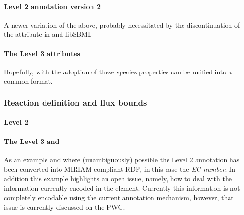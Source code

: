 \paragraph{\SBML Level 2 \Species annotation version 2}
A newer variation of the above, probably necessitated by the discontinuation of the  attribute in \SBML and \textsf{libSBML}
%

\paragraph{The \SBML Level 3 \Species attributes}
Hopefully, with the adoption of \SBML \FBC these species properties can be unified into a common format.
%

\subsubsection*{Reaction definition and flux bounds}

\paragraph{\SBML Level 2 \Reaction}
%

\paragraph{The \SBML Level 3 \Reaction and \FluxBound}

As an example and where (unambiguously) possible the \SBML Level 2 annotation has been converted into MIRIAM compliant RDF, in this case the \textit{EC number}. In addition this example highlights an open issue, namely, how to deal with the information currently encoded in the \Notes element. Currently this information is not completely encodable using the current \SBML annotation mechanism, however, that issue is currently discussed on the PWG.
%
%
